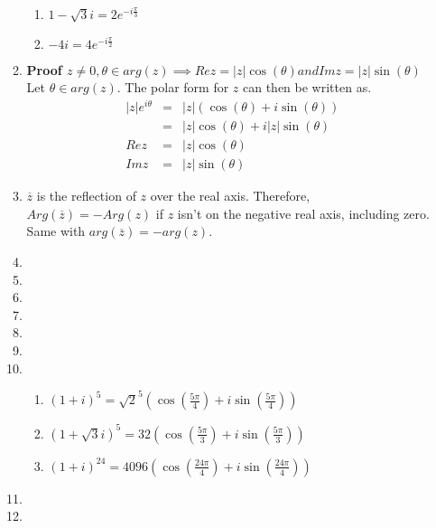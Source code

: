 \documentclass{article}%
\newcommand\abs[1]{\left|#1\right|}
\newenvironment{proof}[1][]{\begin{samepage}\textbf{Proof #1} }{\end{samepage}}
\begin{document}
\begin{enumerate}
\begin{enumerate}[label*=\arabic*.]
\begin{enumerate}[label=\alph*]
            \item %
                $1-\sqrt{3}i=2e^{-i\frac{\pi}{3}}$
            \item %
                $-4i=4e^{-i\frac{\pi}{2}}$
        \end{enumerate}
        \item %
        \begin{proof}[$z \neq 0, \theta \in arg(z) \implies Re z=\abs{z}\cos(\theta) and Im z = \abs{z}\sin(\theta)$]
            Let $\theta \in arg(z)$.
            The polar form for $z$ can then be written as.
            \begin{eqnarray*}
                \abs{z} e^{i \theta} &=& \abs{z} (\cos(\theta) + i \sin(\theta)) \\
                                     &=& \abs{z} \cos(\theta) + i\abs{z}\sin(\theta) \\
                                Re z &=& \abs{z} \cos(\theta) \\
                                Im z &=& \abs{z} \sin(\theta)
            \end{eqnarray*}
        \end{proof}
        \item %
            $\overline{z}$ is the reflection of $z$ over the real axis.  Therefore, $Arg(\overline{z})=-Arg(z)$ if $z$ isn't on the negative real axis, including zero. Same with $arg(\overline{z})=-arg(z)$.
        \item %
        \item %
        \item %
        \item %
        \item %
        \item %
        \item %
        \begin{enumerate}[label=\alph*]
            \item %
                $(1+i)^5=\sqrt{2}^5(\cos(\frac{5 \pi}{4}) + i \sin(\frac{5 \pi}{4}))$
            \item %
                $(1+\sqrt{3}i)^5=32(\cos(\frac{5 \pi}{3}) + i \sin(\frac{5 \pi}{3}))$
            \item %
                $(1+i)^{24}=4096(\cos(\frac{24 \pi}{4}) + i \sin(\frac{24 \pi}{4}))$
        \end{enumerate}
        \item %
        \item %

\end{enumerate}
\end{enumerate}
\end{document}
